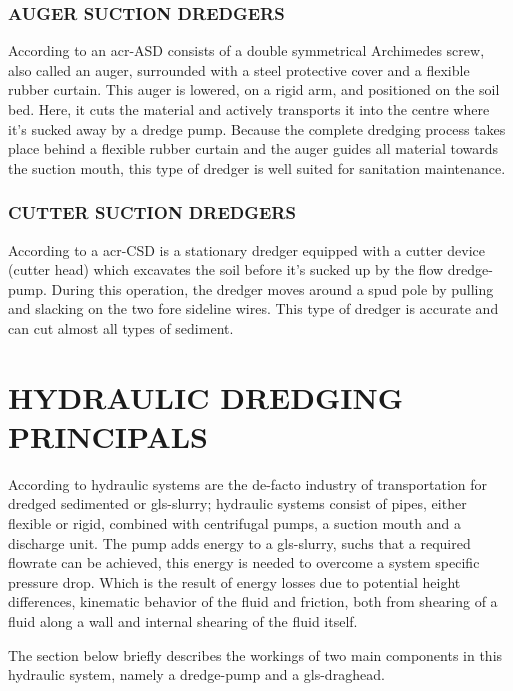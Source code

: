 \subsubsection{AUGER SUCTION DREDGERS}
According to \citet{vbko_vereniging_van_waterbouwers_in_bagger_kust_en_oeverwerken_voortgezette_1998} an
\gls{acr-ASD} consists of a double symmetrical Archimedes screw, also called an auger, surrounded with a steel
protective cover and a flexible rubber curtain. This auger is lowered, on a rigid arm, and positioned on the soil bed.
Here, it cuts the material and actively transports it into the centre where it's sucked away by a dredge pump. Because
the complete dredging process takes place behind a flexible rubber curtain and the auger guides all material towards the
suction mouth, this type of dredger is well suited for sanitation maintenance.

\subsubsection{CUTTER SUCTION DREDGERS}
According to \citet{vlasblom_designing_nodate} a \gls{acr-CSD} is a stationary dredger equipped with a cutter
device (cutter head)  which excavates the soil before it's sucked up by the flow dredge-pump. During this operation, the
dredger moves around a spud pole by pulling and slacking on the two fore sideline wires. This type of dredger is
accurate and can cut almost all types of sediment.


\section{HYDRAULIC DREDGING PRINCIPALS}
According to \citet{van_den_berg_ihc_2013} hydraulic systems are the de-facto industry of transportation for dredged
sedimented or \gls{gls-slurry}; hydraulic systems consist of pipes, either flexible or rigid, combined with centrifugal
pumps, a suction mouth and a discharge unit. The pump adds energy to a \gls{gls-slurry}, suchs that a required flowrate
can be achieved, this energy is needed to overcome a system specific pressure drop. Which is the result of energy losses
due to potential height differences, kinematic behavior of the fluid and friction, both from shearing of a fluid along
a wall and internal shearing of the fluid itself.

The section below briefly describes the workings of two main components in this hydraulic system, namely a dredge-pump
and a \gls{gls-draghead}.

